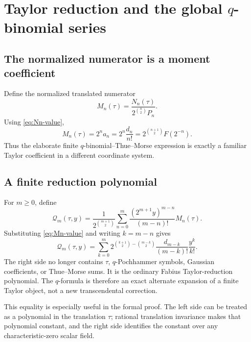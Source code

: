 \documentclass[11pt]{article}
\theoremstyle{definition}
\newcommand{\Fabius}{F}
\begin{document}
\section{Taylor reduction and the global \texorpdfstring{$q$}{q}-binomial series}
\label{sec:taylor-global}

\subsection{The normalized numerator is a moment coefficient}

Define the normalized translated numerator
\begin{equation}
  M_n(\tau)
  =\frac{N_n(\tau)}{2^{\binom{n}{2}}P_n}.
  \label{eq:Mn-definition}
\end{equation}
Using \cref{eq:Nn-value},
\begin{equation}
  M_n(\tau)=2^na_n
  =2^n\frac{d_n}{n!}
  =2^{\binom{n+1}{2}}\Fabius(2^{-n}).
  \label{eq:Mn-value}
\end{equation}
Thus the elaborate finite $q$-binomial--Thue--Morse expression is exactly a familiar Taylor coefficient in a different coordinate system.

\subsection{A finite reduction polynomial}

For $m\ge0$, define
\begin{equation}
  \mathcal Q_m(\tau,y)
  =\frac{1}{2^{\binom{m+1}{2}}}
    \sum_{n=0}^{m}
      \frac{(2^{m+1}y)^{m-n}}{(m-n)!}M_n(\tau).
  \label{eq:Qm-reduction}
\end{equation}
Substituting \cref{eq:Mn-value} and writing $k=m-n$ gives
\begin{equation}
  \mathcal Q_m(\tau,y)
  =\sum_{k=0}^{m}
    2^{\binom{k+1}{2}-\binom{m-k}{2}}
    \frac{d_{m-k}}{(m-k)!}
    \frac{y^k}{k!}.
  \label{eq:Qm-classical-reduction}
\end{equation}
The right side no longer contains $\tau$, $q$-Pochhammer symbols, Gaussian coefficients, or Thue--Morse sums.  It is the ordinary Fabius Taylor-reduction polynomial.  The $q$-formula is therefore an exact alternate expansion of a finite Taylor object, not a new transcendental correction.

This equality is especially useful in the formal proof.  The left side can be treated as a polynomial in the translation $\tau$; rational translation invariance makes that polynomial constant, and the right side identifies the constant over any characteristic-zero scalar field.
\end{document}
